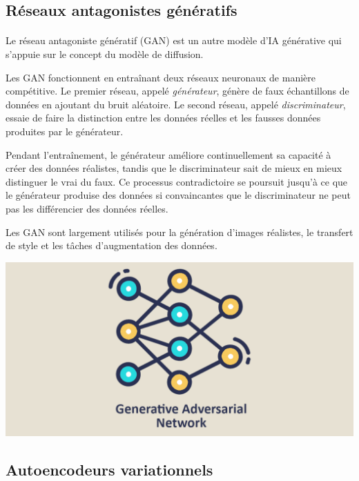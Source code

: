 \subsection{Réseaux antagonistes génératifs}
\paragraph{}
Le réseau antagoniste génératif (GAN) est un autre modèle d'IA générative qui s'appuie
sur le concept du modèle de diffusion.

Les GAN fonctionnent en entraînant deux réseaux neuronaux de manière compétitive.
Le premier réseau, appelé \textit{générateur}, génère de faux échantillons de
données en ajoutant du bruit aléatoire. Le second réseau, appelé \textit{discriminateur},
essaie de faire la distinction entre les données réelles et les fausses données
produites par le générateur.

Pendant l'entraînement, le générateur améliore continuellement sa capacité à créer
des données réalistes, tandis que le discriminateur sait de mieux en mieux
distinguer le vrai du faux. Ce processus contradictoire se poursuit jusqu'à ce que
le générateur produise des données si convaincantes que le discriminateur ne peut
pas les différencier des données réelles.

Les GAN sont largement utilisés pour la génération d'images réalistes, le
transfert de style et les tâches d'augmentation des données.

\vspace{1cm}
\includegraphics[width=\textwidth]{images/gan-datascientest-1024x512.png}
\vspace{1cm}

\subsection{Autoencodeurs variationnels}
